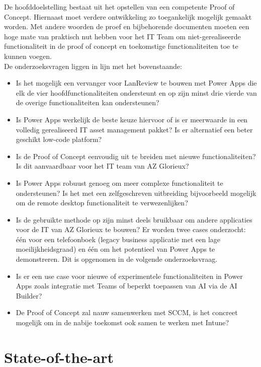 \vspace{5mm}

De hoofddoelstelling bestaat uit het opstellen van een competente Proof of Concept. Hiernaast moet verdere ontwikkeling zo toegankelijk mogelijk gemaakt worden. Met andere woorden de proef en bijbehorende documenten moeten een hoge mate van praktisch nut hebben voor het IT Team om niet-gerealiseerde functionaliteit in de proof of concept en toekomstige functionaliteiten toe te kunnen voegen.\\
De onderzoeksvragen liggen in lijn met het bovenstaande:
\begin{itemize}
    \item Is het mogelijk een vervanger voor LanReview te bouwen met Power Apps die elk de vier hoofdfunctionaliteiten ondersteunt en op zijn minst drie vierde van de overige functionaliteiten kan ondersteunen?
    \item Is Power Apps werkelijk de beste keuze hiervoor of is er meerwaarde in een volledig gerealiseerd IT asset management pakket? Is er alternatief een beter geschikt low-code platform?
    \item Is de Proof of Concept eenvoudig uit te breiden met nieuwe functionaliteiten? Is dit aanvaardbaar voor het IT team van AZ Glorieux?
    \item Is Power Apps robuust genoeg om meer complexe functionaliteit te ondersteunen? Is het met een zelfgeschreven uitbreiding bijvoorbeeld mogelijk om de remote desktop functionaliteit te verwezenlijken?
    \item Is de gebruikte methode op zijn minst deels bruikbaar om andere applicaties voor de IT van AZ Glorieux te bouwen? Er worden twee cases onderzocht: één voor een telefoonboek (legacy business applicatie met een lage moeilijkheidsgraad) en één om het potentieel van Power Apps te demonstreren. Dit is opgenomen in de volgende onderzoeksvraag.
    \item Is er een use case voor nieuwe of experimentele functionaliteiten in Power Apps zoals integratie met Teams of beperkt toepassen van AI via de AI Builder?
    \item De Proof of Concept zal nauw samenwerken met SCCM, is het concreet mogelijk om in de nabije toekomst ook samen te werken met Intune?
\end{itemize}



\section{State-of-the-art}
\label{sec:state-of-the-art}


